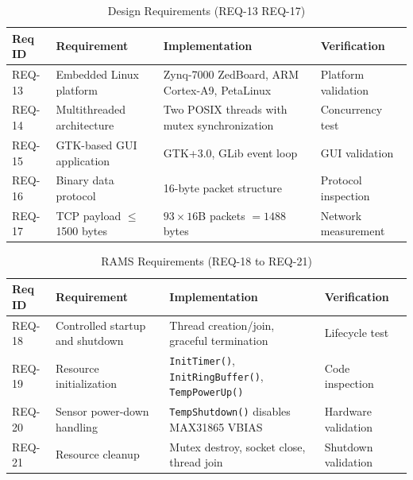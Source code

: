 \begin{table}[h!]
    \centering
    \label{tab:design_traceability}
    \small
    \begin{tabularx}{\linewidth}{|l|X|X|l|}
        \hline
        \textbf{Req ID} & \textbf{Requirement} & \textbf{Implementation} & \textbf{Verification} \\
        \hline
        REQ-13 & Embedded Linux platform       & Zynq-7000 ZedBoard, ARM Cortex-A9, PetaLinux        & Platform validation  \\
        \hline
        REQ-14 & Multithreaded architecture    & Two POSIX threads with mutex synchronization         & Concurrency test     \\
        \hline
        REQ-15 & GTK-based GUI application     & GTK+3.0, GLib event loop                            & GUI validation       \\
        \hline
        REQ-16 & Binary data protocol          & 16-byte packet structure                            & Protocol inspection  \\
        \hline
        REQ-17 & TCP payload $\leq$ 1500 bytes & $93 \times 16$B packets $= 1488$ bytes               & Network measurement  \\
        \hline
    \end{tabularx}
    \caption{Design Requirements (REQ-13 \rightarrow REQ-17)}
\end{table}




\begin{table}[H]
    \centering
    \label{tab:rams_traceability}
    \small
    \begin{tabularx}{\linewidth}{|l|X|X|l|}
        \hline
        \textbf{Req ID} & \textbf{Requirement} & \textbf{Implementation} & \textbf{Verification} \\
        \hline
        REQ-18 & Controlled startup and shutdown & Thread creation/join, graceful termination                                          & Lifecycle test      \\
        \hline
        REQ-19 & Resource initialization         & \texttt{InitTimer()}, \texttt{InitRingBuffer()}, \texttt{TempPowerUp()}              & Code inspection     \\
        \hline
        REQ-20 & Sensor power-down handling      & \texttt{TempShutdown()} disables MAX31865 VBIAS                                     & Hardware validation \\
        \hline
        REQ-21 & Resource cleanup                & Mutex destroy, socket close, thread join                                            & Shutdown validation \\
        \hline
    \end{tabularx}
    \caption{RAMS Requirements (REQ-18 to REQ-21)}
\end{table}


